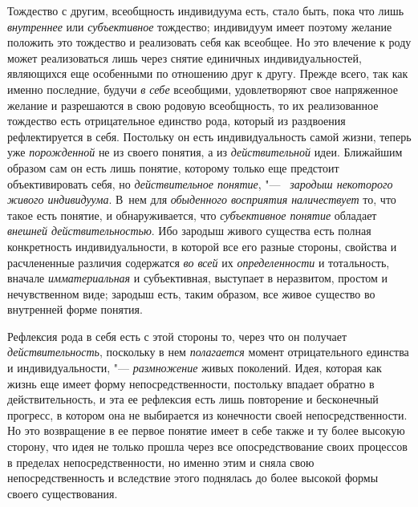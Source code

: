 {{Тождество с другим, всеобщность индивидуума есть, стало быть,
пока что лишь {\em внутреннее}
или {\em субъективное}
тождество; индивидуум имеет поэтому желание положить это
тождество и реализовать себя как всеобщее. Но это влечение к роду может
реализоваться лишь через снятие единичных индивидуальностей, являющихся еще
особенными по отношению друг к другу. Прежде всего, так как именно
последние, будучи {\em в себе}
всеобщими, удовлетворяют свое напряженное желание и
разрешаются в свою родовую всеобщность, то их реализованное тождество есть
отрицательное единство рода, который из раздвоения рефлектируется в себя.
Постольку он есть индивидуальность самой жизни, теперь уже
{\em порожденной} не из
своего понятия, а из
{\em действительной}
идеи. Ближайшим образом сам он есть лишь
понятие, которому только еще предстоит объективировать себя, но
{\em действительное понятие}, "---
\ {\em зародыш некоторого живого
индивидуума}. В~нем для
{\em обыденного восприятия
наличествует} то, что такое есть понятие, и обнаруживается,
что {\em субъективное понятие}
обладает {\em внешней
действительностью}. Ибо зародыш живого существа есть полная
конкретность индивидуальности, в которой все его разные стороны, свойства и
расчлененные различия содержатся {\em во
всей} их
{\em определенности} и
тотальность, вначале
{\em имматериальная} и
субъективная, выступает в неразвитом, простом и нечувственном виде; зародыш
есть, таким образом, все живое существо во внутренней форме понятия.

Рефлексия рода в себя есть с этой стороны то, через что он
получает {\em действительность},
поскольку в нем
{\em полагается} момент
отрицательного единства и индивидуальности, "---
{\em размножение} живых
поколений. Идея, которая как жизнь еще имеет форму непосредственности,
постольку впадает обратно в действительность, и эта ее рефлексия есть лишь
повторение и бесконечный прогресс, в котором она не выбирается из
конечности своей непосредственности. Но это возвращение в ее первое понятие
имеет в себе также и ту более высокую сторону, что идея не только прошла
через все опосредствование своих процессов в пределах непосредственности,
но именно этим и сняла свою непосредственность и вследствие этого поднялась
до более высокой формы своего существования.

}}
